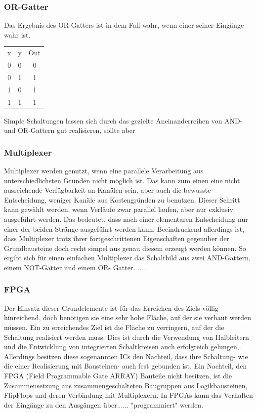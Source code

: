 \documentclass[conference]{IEEEtran}
\begin{document}
\subsubsection{OR-Gatter}
Das Ergebnis des OR-Gatters ist in dem Fall wahr, wenn einer seiner Eingänge wahr ist.\\
\begin{center}
\begin{tabular}[h]{ccc}
x&y&Out\\
0&0&0\\
0&1&1\\
1&0&1\\
1&1&1\\
\end{tabular}
\end{center}
Simple Schaltungen lassen sich durch das gezielte Aneinanderreihen von AND- und OR-Gattern gut realisieren, sollte aber 
\subsubsection{Multiplexer}
Multiplexer werden genutzt, wenn eine parallele Verarbeitung aus unterschiedlichsten Gründen nicht möglich ist. Das kann zum einen eine nicht ausreichende Verfügbarkeit an Kanälen sein, aber auch die bewusste Entscheidung, weniger Kanäle aus Kostengründen zu benutzen. Dieser Schritt kann gewählt werden, wenn Verläufe zwar parallel laufen, aber nur exklusiv ausgeführt werden. Das bedeutet, dass nach einer elementaren Entscheidung nur einer der beiden Stränge ausgeführt werden kann. Beeindruckend allerdings ist, dass Multiplexer trotz ihrer fortgeschrittenen Eigenschaften gegenüber der Grundbausteine doch recht simpel aus genau diesem erzeugt werden können. So ergibt sich für einen einfachen Multiplexer das Schaltbild aus zwei AND-Gattern, einem NOT-Gatter und einem OR- Gatter. .....
\subsubsection{FPGA}
Der Einsatz dieser Grundelemente ist für das Erreichen des Ziels völlig hinreichend, doch benötigen sie eine sehr hohe Fläche, auf der sie verbaut werden müssen. Ein zu erreichendes Ziel ist die Fläche zu verringern, auf der die Schaltung realisiert werden muss. Dies ist durch die Verwendung von Halbleitern und die Entwicklung von integrierten Schaltkreisen auch erfolgreich gelungen,. Allerdings besitzen diese sogenannten ICs den Nachteil, dass ihre Schaltung- wie die einer Realisierung mit Bausteinen- auch fest gebunden ist. Ein Nachteil, den FPGA (Field Programmable Gate ARRAY) Bauteile nicht besitzen, ist die Zusammensetzung aus zusammengeschalteten Baugruppen aus Logikbausteinen, FlipFlops und deren Verbindung mit Multiplexern. In FPGAs kann das Verhalten der Eingänge zu den Ausgängen über{\color{red}...... }"programmiert" werden.
\end{document}
